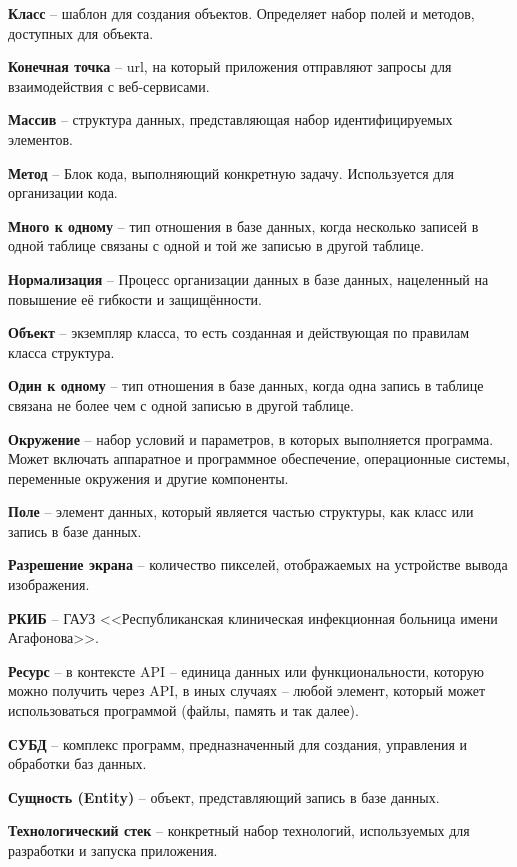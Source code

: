 \documentclass[a4paper,article]{article}
\begin{document}
\begin{sloppypar}
    \textbf{Класс} -- шаблон для создания объектов. Определяет набор полей и методов, доступных для объекта.

    \textbf{Конечная точка} -- url, на который приложения отправляют запросы для взаимодействия с веб-сервисами.

    \textbf{Массив} -- структура данных, представляющая набор идентифицируемых элементов.

    \textbf{Метод} -- Блок кода, выполняющий конкретную задачу. Используется для организации кода.

    \textbf{Много к одному} -- тип отношения в базе данных, когда несколько записей в одной таблице связаны с одной и той же записью в другой таблице.

    \textbf{Нормализация} -- Процесс организации данных в базе данных, нацеленный на повышение её гибкости и защищённости.

    \textbf{Объект} -- экземпляр класса, то есть созданная и действующая по правилам класса структура.

    \textbf{Один к одному} -- тип отношения в базе данных, когда одна запись в таблице связана не более чем с одной записью в другой таблице.

    \textbf{Окружение} -- набор условий и параметров, в которых выполняется программа. Может включать аппаратное и программное обеспечение, операционные системы, переменные окружения и другие компоненты.

    \textbf{Поле} -- элемент данных, который является частью структуры, как класс или запись в базе данных.

    \textbf{Разрешение экрана} -- количество пикселей, отображаемых на устройстве вывода изображения.

    \textbf{РКИБ} -- ГАУЗ <<Республиканская клиническая инфекционная больница имени Агафонова>>.

    \textbf{Ресурс} -- в контексте API -- единица данных или функциональности, которую можно получить через API, в иных случаях -- любой элемент, который может использоваться программой (файлы, память и так далее).

    \textbf{СУБД} -- комплекс программ, предназначенный для создания, управления и обработки баз данных.

    \textbf{Сущность (Entity)} -- объект, представляющий запись в базе данных.

    \textbf{Технологический стек} -- конкретный набор технологий, используемых для разработки и запуска приложения.


\end{sloppypar}
\end{document}
